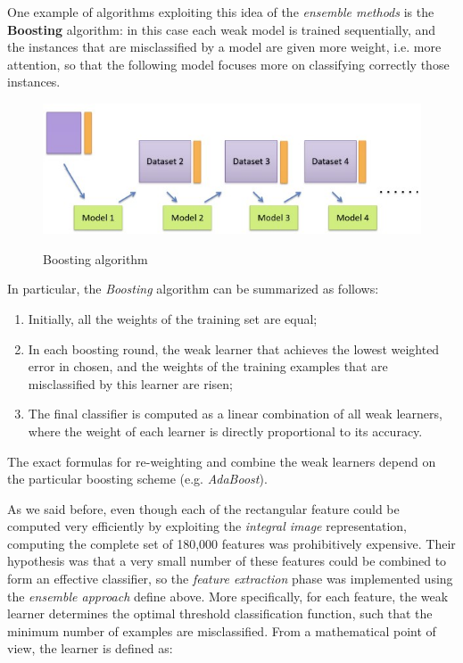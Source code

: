 One example of algorithms exploiting this idea of the \textit{ensemble methods} is the \textbf{Boosting} algorithm: in this case each weak model is trained sequentially, and the instances that are misclassified by a model are given more weight, i.e. more attention, so that the following model focuses more on classifying correctly those instances.

\begin{figure}[h!]
		\centering
		\includegraphics[scale = 1.4]{img/boosting.jpg}
        \label{boosting}
        \caption{Boosting algorithm}
\end{figure}

In particular, the \textit{Boosting} algorithm can be summarized as follows:

\begin{enumerate}
    \item Initially, all the weights of the training set are equal;
    \item In each boosting round, the weak learner that achieves the lowest weighted error in chosen, and the weights of the training examples that are misclassified by this learner are risen;
    \item The final classifier is computed as a linear combination of all weak learners, where the weight of each learner is directly proportional to its accuracy.
\end{enumerate}

The exact formulas for re-weighting and combine the weak learners depend on the particular boosting scheme (e.g. \textit{AdaBoost}). 

As we said before, even though each of the rectangular feature could be computed very efficiently by exploiting the \textit{integral image} representation, computing the complete set of 180,000 features was prohibitively expensive. Their hypothesis was that a very small number of these features could be combined to form an effective classifier, so the \textit{feature extraction} phase was implemented using the \textit{ensemble approach} define above. More specifically, for each feature, the weak learner determines the optimal threshold classification function, such that the minimum number of examples are misclassified. From a mathematical point of view, the learner is defined as:

